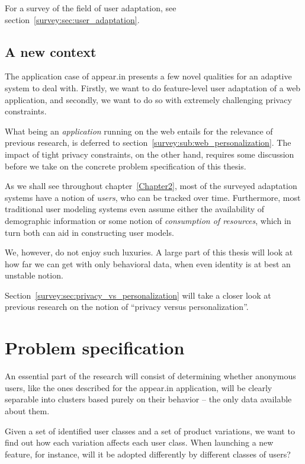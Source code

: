 For a survey of the field of user adaptation, see section~\ref{survey:sec:user_adaptation}.

\subsection{A new context}
\label{intro:sub:adaptation_context}

The application case of appear.in presents a few novel qualities for an adaptive system to deal with. Firstly, we want to do feature-level user adaptation of a web application, and secondly, we want to do so with extremely challenging privacy constraints.

What being an \emph{application} running on the web entails for the relevance of previous research, is deferred to section~\ref{survey:sub:web_personalization}. The impact of tight privacy constraints, on the other hand, requires some discussion before we take on the concrete problem specification of this thesis.

As we shall see throughout chapter~\ref{Chapter2}, most of the surveyed adaptation systems have a notion of \emph{users}, who can be tracked over time. Furthermore, most traditional user modeling systems even assume either the availability of demographic information or some notion of \emph{consumption of resources}, which in turn both can aid in constructing user models.

We, however, do not enjoy such luxuries. A large part of this thesis will look at how far we can get with only behavioral data, when even identity is at best an unstable notion.

Section~\ref{survey:sec:privacy_vs_personalization} will take a closer look at previous research on the notion of ``privacy versus personalization''.

\section{Problem specification}
\label{intro:sec:problem_specification}

An essential part of the research will consist of determining whether anonymous users, like the ones described for the appear.in application, will be clearly separable into clusters based purely on their behavior -- the only data available about them.

Given a set of identified user classes and a set of product variations, we want to find out how each variation affects each user class. When launching a new feature, for instance, will it be adopted differently by different classes of users?


